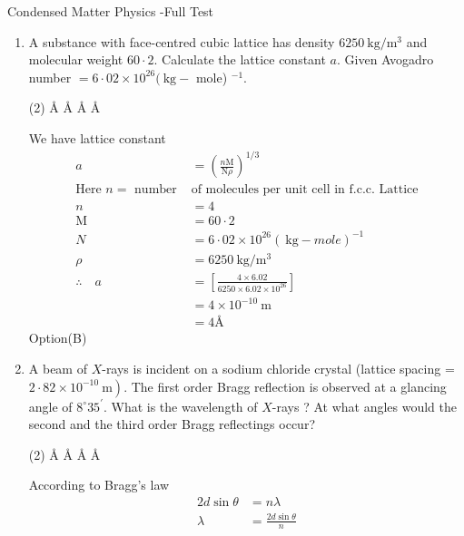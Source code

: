 \begin{abox}
	Condensed Matter Physics -Full Test
	\end{abox}
\begin{enumerate}
	\item A substance with face-centred cubic lattice has density $6250 \mathrm{~kg} / \mathrm{m}^{3}$ and molecular weight ${6 0} \cdot 2$. Calculate the lattice constant $a$. Given Avogadro number $=6 \cdot 02 \times 10^{26}(\mathrm{~kg}-$ mole) ${ }^{-1}$.
	\begin{tasks}(2)
		   \AA
		   \AA
		  \AA 
		   \AA 
	\end{tasks}
	\begin{answer}
		We have lattice constant
		$$\begin{aligned}
		a&=\left(\frac{n \mathrm{M}}{\mathrm{N} \rho}\right)^{1 / 3}\\
		\text{Here $n=$ number  }&\text{of molecules per unit cell in f.c.c. Lattice} \\
		n&=4\\
		 \mathrm{M}&=60 \cdot 2\\
		  N&=6 \cdot 02 \times 10^{26}(\mathrm{~kg}- mole )^{-1}\\
		 \rho&=6250 \mathrm{~kg} / \mathrm{m}^{3}\\
		\therefore \quad a &=\left[\frac{4 \times 6.02}{6250 \times 6.02 \times 10^{26}}\right] \\
		&=4 \times 10^{-10} \mathrm{~m} \\
		&=4 \text{\AA}
		\end{aligned}$$
		Option(B)
	\end{answer}
 \item A beam of $X$-rays is incident on a sodium chloride crystal (lattice spacing = $\left.2 \cdot 82 \times 10^{-10} \mathrm{~m}\right)$. The first order Bragg reflection is observed at a glancing angle of $8^{\circ} 35^{\prime}$. What is the wavelength of $X$-rays ? At what angles would the second and the third order Bragg reflectings occur?
\begin{tasks}(2)
	   \AA
	   \AA
	  \AA 
	   \AA 
\end{tasks}
\begin{answer}
According to Bragg's law
$$
\begin{aligned}
2 d \sin \theta &=n \lambda \\
\lambda &=\frac{2 d \sin \theta}{n}

\end{aligned}$$
\end{answer}
\end{enumerate}
